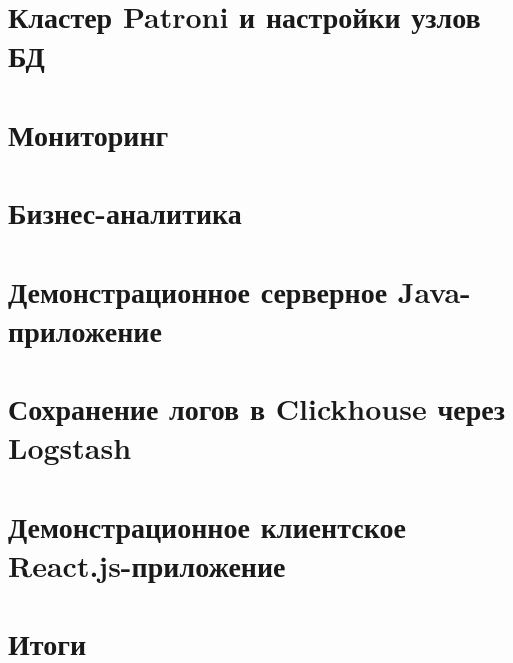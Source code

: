 \documentclass[a4paper,12pt]{article}
\begin{document}
    \section{Кластер Patroni и настройки узлов БД}\label{sec:patronicluster}
    


    \section{Мониторинг}\label{sec:monitoring}
    


    \section{Бизнес-аналитика}\label{sec:businessintelligence}
    


    \section{Демонстрационное серверное Java-приложение}\label{sec:javaapp}
    


    \section{Сохранение логов в Clickhouse через Logstash}\label{sec:logstashclickhouse}
    


    \section{Демонстрационное клиентское React.js-приложение}\label{sec:reactapp}
    


    \section{Итоги}\label{sec:results}
    
\end{document}
